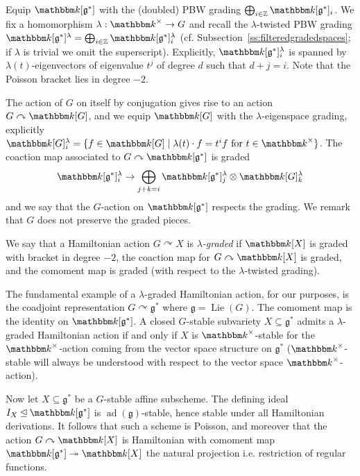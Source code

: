\documentclass[twoside,12pt,reqno]{amsart}
\theoremstyle{remark}
\numberwithin{equation}{section}
\def\onto{\twoheadrightarrow}
\def\k{{\mathbbm k}}
\def\Lie{\operatorname{Lie}}
\def\ad{\operatorname{ad}}
\def\Z{{\mathbb Z}}
\def\g{{\mathfrak g}}
\begin{document}
Equip $\k[\g^*]$ with the (doubled) PBW grading $\bigoplus_{i\in \Z} \k[\g^*]_i$. We fix a homomorphism $\lambda : \k^\times \to G$ and recall the $\lambda$-twisted PBW grading $\k[\g^*]^\lambda = \bigoplus_{i\in \Z} \k[\g^*]^\lambda_i$ (cf. Subsection~\ref{ss:filteredgradedspaces}; if $\lambda$ is trivial we omit the superscript). Explicitly, $\k[\g^*]_i^\lambda$ is spanned by $\lambda(t)$-eigenvectors of eigenvalue $t^j$ of degree $d$ such that $d + j = i$. Note that the Poisson bracket lies in degree $-2$.

The action of $G$ on itself by conjugation gives rise to an action $G \curvearrowright \k[G]$, and we equip $\k[G]$ with the $\lambda$-eigenspace grading, explicitly $\k[G]_i^\lambda = \{f\in \k[G] \mid \lambda(t) \cdot f = t^i f \text{ for } t\in \k^\times\}$. The coaction map associated to $G \curvearrowright \k[\g^*]$ is graded
$$\k[\g^*]_i^\lambda \to \bigoplus_{j+k=i} \k[\g^*]_j^\lambda \otimes \k[G]_k^\lambda$$
and we say that the $G$-action on $\k[\g^*]$ respects the grading. We remark that $G$ does not preserve the graded pieces. 

We say that a Hamiltonian action $G \curvearrowright X$ is {\em $\lambda$-graded} if $\k[X]$ is graded with bracket in degree $-2$, the coaction map for $G\curvearrowright\k[X]$ is graded, and the comoment map is graded (with respect to the $\lambda$-twisted grading).

The fundamental example of a $\lambda$-graded Hamiltonian action, for our purposes, is the coadjoint representation $G\curvearrowright \g^*$ where $\g = \Lie(G)$. The comoment map is the identity on $\k[\g^*]$. A closed $G$-stable subvariety $X \subseteq \g^*$ admits a $\lambda$-graded Hamiltonian action if and only if $X$ is $\k^\times$-stable for the $\k^\times$-action coming from the vector space structure on $\g^*$ ($\k^\times$-stable will always be understood with respect to the vector space $\k^\times$-action).


Now let $X\subseteq \g^*$ be a $G$-stable affine subscheme. The defining ideal $I_X \unlhd \k[\g^*]$ is $\ad(\g)$-stable, hence stable under all Hamiltonian derivations. It follows that such a scheme is Poisson, and moreover that the action $G\curvearrowright\k[X]$ is Hamiltonian with comoment map $\k[\g^*] \onto \k[X]$ the natural projection i.e. restriction of regular functions. 
\end{document}
